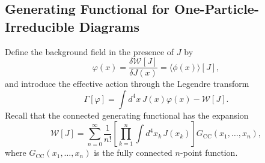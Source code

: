\subsection{Generating Functional for One-Particle-Irreducible Diagrams}

Define the background field in the presence of $J$ by
\begin{equation}
    \varphi(x)
    =\frac{\delta\mathcal W[J]}{\delta J(x)}
    =\langle\phi(x)\rangle[J],
\end{equation}
and introduce the effective action through the Legendre transform
\begin{equation}
    \Gamma[\varphi]
    =\int d^4x\,J(x)\varphi(x)-\mathcal W[J].
\end{equation}
Recall that the connected generating functional has the expansion
\begin{equation}
    \mathcal W[J]
    =\sum_{n=0}^{\infty}\frac{1}{n!}
    \left[
        \prod_{k=1}^{n}\int d^4x_k\,J(x_k)
    \right]
    G_{\mathrm{CC}}(x_1,\ldots,x_n),
\end{equation}
where $G_{\mathrm{CC}}(x_1,\ldots,x_n)$ is the fully connected $n$-point
function.

